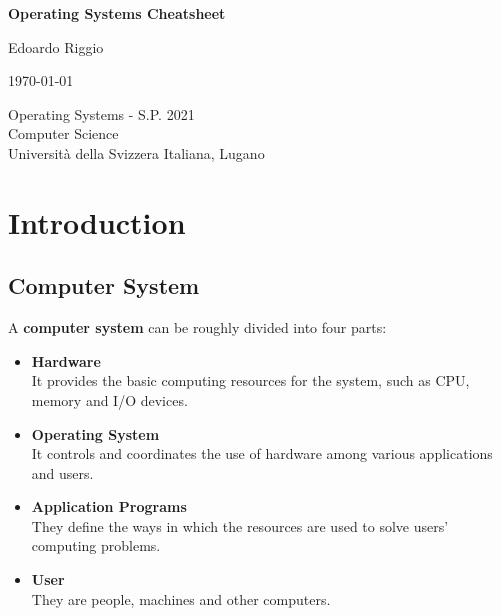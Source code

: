 \documentclass{article}
\begin{document}
\begin{titlepage}
    \begin{center}
        \vspace*{1cm}
        
        \Huge
        \textbf{Operating Systems Cheatsheet}
        
        \vspace{0.5cm}
        \LARGE
        
        \vspace{.5cm}
        
        Edoardo Riggio
   		  \vspace{1.5cm}
       
        \vfill
        
        \today
        
        \vspace{.8cm}
          \Large
          Operating Systems - S.P. 2021 \\
        Computer Science\\
        Universit\`{a} della Svizzera Italiana, Lugano\\
        
    \end{center}
\end{titlepage}

\tableofcontents

\newpage

\section{Introduction}
\subsection{Computer System}
A \textbf{computer system} can be roughly divided into four parts:

\begin{itemize}
	\item \textbf{Hardware}
	\vspace{.2cm} \\
	It provides the basic computing resources for the system, such as CPU, memory and I/O devices.
	
	\item \textbf{Operating System}
	\vspace{.2cm} \\
	It controls and coordinates the use of hardware among various applications and users.
	
	\item \textbf{Application Programs}
	\vspace{.2cm} \\
	They define the ways in which the resources are used to solve users' computing problems.
	
	\item \textbf{User}
	\vspace{.2cm} \\
	They are people, machines and other computers.
\end{itemize}
\end{document}
